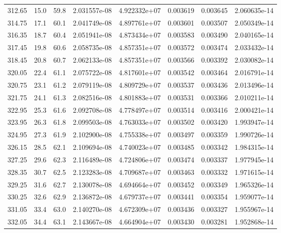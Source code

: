 \documentclass[a4paper,11pt]{article}
\begin{document}
\begin{table}[b]
\begin{tabular}{|c|c|c|c|c|c|c|c|}
            312.65 & 15.0   & 59.8   & 2.031557e-08 & 4.922332e+07 & 0.003619  & 0.003645   & 2.060635e-14  \\
            314.75 & 17.1   & 60.1   & 2.041749e-08 & 4.897761e+07 &  0.003601 &0.003507    &  2.050349e-14  \\
            316.35 & 18.7   & 60.4   & 2.051941e-08 & 4.873434e+07 & 0.003583 & 0.003490   &  2.040165e-14 \\
            317.45 & 19.8   & 60.6   & 2.058735e-08 & 4.857351e+07 & 0.003572  & 0.003474   &  2.033432e-14 \\
            318.45 & 20.8   & 60.7   & 2.062133e-08  & 4.857351e+07 & 0.003566  & 0.003392   &  2.030082e-14  \\
            320.05 & 22.4   & 61.1   & 2.075722e-08 & 4.817601e+07 &  0.003542 & 0.003464   &  2.016791e-14 \\
            320.75 & 23.1   & 61.2   & 2.079119e-08 & 4.809729e+07 & 0.003537 & 0.003436   &  2.013496e-14  \\
            321.75 & 24.1   & 61.3   & 2.082516e-08 & 4.801883e+07 & 0.003531  & 0.003366   &  2.010211e-14  \\
            322.95 & 25.3   & 61.6 & 2.092708e-08  & 4.778497e+07 &  0.003514 & 0.003416   &  2.000421e-14  \\
            323.95 & 26.3   & 61.8   & 2.099503e-08 & 4.763033e+07 & 0.003502  & 0.003420   &  1.993947e-14 \\
            324.95 & 27.3 & 61.9   & 2.102900e-08 & 4.755338e+07 &  0.003497 & 0.003359   & 1.990726e-14   \\
            326.15 & 28.5   & 62.1   & 2.109694e-08 & 4.740023e+07 &  0.003485  & 0.003342   & 1.984315e-14 \\
            327.25 & 29.6   & 62.3   & 2.116489e-08 & 4.724806e+07 &  0.003474  & 0.003337   & 1.977945e-14  \\
            328.35 & 30.7   & 62.5   & 2.123283e-08  & 4.709687e+07 &  0.003463  & 0.003332   & 1.971615e-14 \\
            329.25 & 31.6   & 62.7   & 2.130078e-08 &4.694664e+07 & 0.003452 & 0.003349   &  1.965326e-14   \\
            330.25 & 32.6 & 62.9   &  2.136872e-08 & 4.679737e+07 & 0.003441  & 0.003354   & 1.959077e-14   \\
            331.05 & 33.4   & 63.0   & 2.140270e-08 & 4.672309e+07 & 0.003436  &0.003327    &  1.955967e-14 \\
            332.05 & 34.4   & 63.1    & 2.143667e-08 & 4.664904e+07 & 0.003430  & 0.003281   & 1.952868e-14   \\

\end{tabular}
\end{table}
\end{document}
